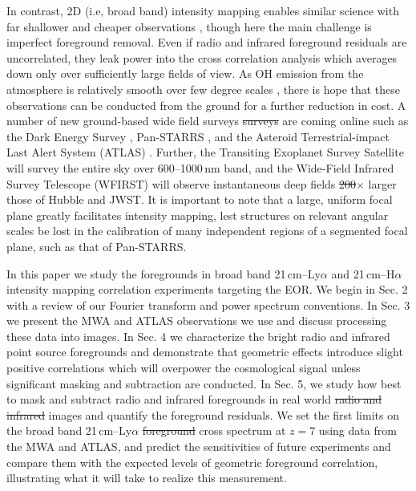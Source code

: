 \documentclass[numberedappendix]{emulateapj}
\providecommand{\DIFadd}[1]{{\protect\color{blue}\uwave{#1}}} %
\providecommand{\DIFdel}[1]{{\protect\color{red}\sout{#1}}}                      %
\providecommand{\DIFaddbegin}{} %
\providecommand{\DIFaddend}{} %
\providecommand{\DIFdelbegin}{} %
\providecommand{\DIFdelend}{} %
\begin{document}
In contrast, 2D (i.e, broad band) intensity mapping enables similar science with far shallower and cheaper observations \citep{StarsAndReionization,mao14}, though here the main challenge is imperfect foreground removal. Even if radio and infrared foreground residuals are uncorrelated, they leak power into the cross correlation analysis which averages down only over sufficiently large fields of view. As OH emission from the atmosphere is relatively smooth over few degree scales \citep{high10}, there is hope that these observations can be conducted from the ground for a further reduction in cost. A number of new ground-based wide field surveys \DIFdelbegin \DIFdel{surveys }\DIFdelend are coming online such as the Dark Energy Survey \citep{des16}, Pan-STARRS \citep{tonry12}, and the Asteroid Terrestrial-impact Last Alert System (ATLAS) \citep{tonry11}. Further, the Transiting Exoplanet Survey Satellite \citep{ricker14} will survey the entire sky over 600--1000\,nm band, and the Wide-Field Infrared Survey Telescope (WFIRST) \citep{Spergel2013} will observe instantaneous deep fields \DIFdelbegin \DIFdel{200}\DIFdelend \DIFaddbegin \DIFadd{100}\DIFaddend $\times$ larger those of Hubble and JWST. It is important to note that a large, uniform focal plane greatly facilitates intensity mapping, lest structures on relevant angular scales be lost in the calibration of many independent regions of a segmented focal plane, such as that of Pan-STARRS. 

In this paper we study the foregrounds in broad band 21\,cm--Ly$\alpha$ and 21\,cm--H$\alpha$ intensity mapping correlation experiments targeting the EOR. We begin in Sec. 2 with a review of our Fourier transform and power spectrum conventions.
  In Sec. 3 we present the MWA and ATLAS observations we use and discuss processing these data into images. 
   In Sec. 4 we characterize the bright radio and infrared point source foregrounds and 
   demonstrate that geometric effects introduce slight positive correlations which will overpower the cosmological signal
   unless significant masking and subtraction are conducted. 
   In Sec. 5, we study how best to mask and subtract radio and infrared foregrounds in real world \DIFdelbegin \DIFdel{radio and infrared }\DIFdelend images and 
   quantify the foreground residuals. We set the first limits 
   on \DIFaddbegin \DIFadd{residual foregrounds of the }\DIFaddend the broad band 21\,cm--Ly$\alpha$ \DIFdelbegin \DIFdel{foreground }\DIFdelend cross spectrum at \DIFdelbegin \DIFdel{$z=7$ }\DIFdelend \DIFaddbegin \DIFadd{$z\sim7$ }\DIFaddend using data from the MWA
     and ATLAS, and predict the sensitivities of future experiments and compare them with the expected levels of geometric foreground correlation, 
     illustrating what it will take to realize this measurement.
\end{document}
